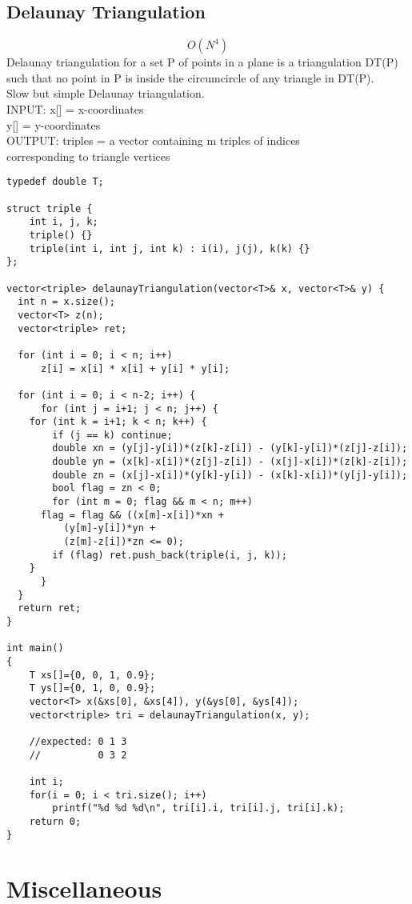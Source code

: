 \documentclass[11pt, oneside]{article}
\begin{document}
\subsection{Delaunay Triangulation}
\[O(N^4)\]
Delaunay triangulation for a set P of points in a plane is a triangulation DT(P) such that no point in P is inside the circumcircle of any triangle in DT(P).\\
Slow but simple Delaunay triangulation.\\
INPUT:    x[] = x-coordinates\\
          y[] = y-coordinates\\
OUTPUT:   triples = a vector containing m triples of indices\\
                    corresponding to triangle vertices
\begin{lstlisting}
typedef double T;

struct triple {
    int i, j, k;
    triple() {}
    triple(int i, int j, int k) : i(i), j(j), k(k) {}
};

vector<triple> delaunayTriangulation(vector<T>& x, vector<T>& y) {
  int n = x.size();
  vector<T> z(n);
  vector<triple> ret;

  for (int i = 0; i < n; i++)
      z[i] = x[i] * x[i] + y[i] * y[i];

  for (int i = 0; i < n-2; i++) {
      for (int j = i+1; j < n; j++) {
    for (int k = i+1; k < n; k++) {
        if (j == k) continue;
        double xn = (y[j]-y[i])*(z[k]-z[i]) - (y[k]-y[i])*(z[j]-z[i]);
        double yn = (x[k]-x[i])*(z[j]-z[i]) - (x[j]-x[i])*(z[k]-z[i]);
        double zn = (x[j]-x[i])*(y[k]-y[i]) - (x[k]-x[i])*(y[j]-y[i]);
        bool flag = zn < 0;
        for (int m = 0; flag && m < n; m++)
      flag = flag && ((x[m]-x[i])*xn + 
          (y[m]-y[i])*yn + 
          (z[m]-z[i])*zn <= 0);
        if (flag) ret.push_back(triple(i, j, k));
    }
      }
  }
  return ret;
}

int main()
{
    T xs[]={0, 0, 1, 0.9};
    T ys[]={0, 1, 0, 0.9};
    vector<T> x(&xs[0], &xs[4]), y(&ys[0], &ys[4]);
    vector<triple> tri = delaunayTriangulation(x, y);
    
    //expected: 0 1 3
    //          0 3 2
    
    int i;
    for(i = 0; i < tri.size(); i++)
        printf("%d %d %d\n", tri[i].i, tri[i].j, tri[i].k);
    return 0;
}
\end{lstlisting}

\section{Miscellaneous}
\end{document}
